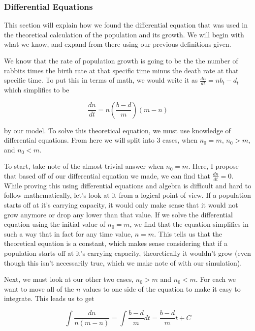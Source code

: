 \documentclass{article}\usepackage[]{graphicx}\usepackage[]{color}
\begin{document}
\subsubsection{Differential Equations}

This section will explain how we found the differential equation that was used in the theoretical calculation of the population and its growth. We will begin with what we know, and expand from there using our previous definitions given.

We know that the rate of population growth is going to be the the number of rabbits times the birth rate at that specific time minus the death rate at that specific time. To put this in terms of math, we would write it as \(\frac{dn}{dt} = nb_t-d_t\) which simplifies to be 

\begin{equation}
\frac{dn}{dt} = n\left(\frac{b-d}{m}\right)(m-n) 
\end{equation}

\noindent by our model. To solve this theoretical equation, we must use knowledge of differential equations. From here we will split into 3 cases, when \(n_0 =m\), \(n_0 > m\), and \(n_0 < m\). 

To start, take note of the almost trivial answer when \(n_0 = m\). Here, I propose that based off of our differential equation we made, we can find that \(\frac{dn}{dt} = 0\). While proving this using differential equations and algebra is difficult and hard to follow mathematically, let's look at it from a logical point of view. If a population starts off at it's carrying capacity, it would only make sense that it would not grow anymore or drop any lower than that value. If we solve the differential equation using the initial value of \(n_0 = m\), we find that the equation simplifies in such a way that in fact for any time value, \(n=m\). This tells us that the theoretical equation is a constant, which makes sense considering that if a population starts off at it's carrying capacity, theoretically it wouldn't grow (even though this isn't necessarily true, which we make note of with our simulation).

Next, we must look at our other two cases, \(n_0 > m\) and \(n_0 < m\). For each we want to move all of the \(n\) values to one side of the equation to make it easy to integrate. This leads us to get 

\begin{equation}
\int \frac{dn}{n(m-n)} = \int \frac{b-d}{m} dt = \frac{b-d}{m} t + C
\end{equation}
\end{document}
